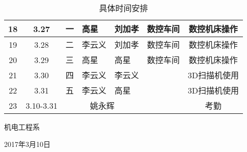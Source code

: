 \documentclass[a4paper,zihao=-4,linespread=1.35]{ctexart}
\begin{document}
\begin{table}[ht]
\begin{center}
\begin{tabular}{|c|c|c|l|l|c|c|}
			18	&3.27	&一	&高星	&刘加孝	&数控车间	&数控机床操作	\\\hline
			19	&3.28	&二	&李云义	&刘加孝	&数控车间	&数控机床操作	\\\hline
			20	&3.29	&三	&高星	&高星	&数控车间	&数控机床操作	\\\hline
			21	&3.30	&四	&李云义	&李云义	&	&3D扫描机使用	\\\hline
			22	&3.31	&五	&李云义	&高星	&	&3D扫描机使用	\\ \hline
			23	&3.10-3.31	&	\multicolumn{3}{c|}{姚永辉}	&	&考勤	\\ \hline
 	\end{tabular}  		
 \caption{具体时间安排}  \label{具体时间安排}
\end{center}
\end{table} 			

\hspace{10.4cm}机电工程系 \par
\hspace{9.6cm}2017年3月10日
\end{document}
